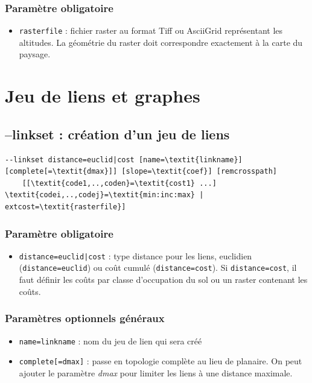 \documentclass[a4paper,10pt]{report}
\begin{document}
\subsubsection{Paramètre obligatoire}
\begin{itemize}
	\item \verb|rasterfile| : fichier raster au format Tiff ou AsciiGrid représentant les altitudes. La géométrie du raster doit correspondre exactement à la carte du paysage.
\end{itemize}

\section{Jeu de liens et graphes}

\subsection{--linkset : création d'un jeu de liens}
\begin{Verbatim}[commandchars=\\\{\}]
--linkset distance=euclid|cost [name=\textit{linkname}] [complete[=\textit{dmax}]] [slope=\textit{coef}] [remcrosspath] 
	[[\textit{code1,..,coden}=\textit{cost1} ...] \textit{codei,..,codej}=\textit{min:inc:max} | extcost=\textit{rasterfile}]
\end{Verbatim}

\subsubsection{Paramètre obligatoire}
\begin{itemize}
	\item \verb+distance=euclid|cost+ : type distance pour les liens, euclidien (\verb|distance=euclid|) ou coût cumulé (\verb|distance=cost|). Si \verb|distance=cost|, il faut définir les coûts par classe d'occupation du sol ou un raster contenant les coûts.
\end{itemize}

\subsubsection{Paramètres optionnels généraux}
\begin{itemize}
	\item \verb|name=linkname| : nom du jeu de lien qui sera créé
	\item \verb|complete[=dmax]| : passe en topologie complète au lieu de planaire. On peut ajouter le paramètre \textit{dmax} pour limiter les liens à une distance maximale.
\end{itemize}
\end{document}
